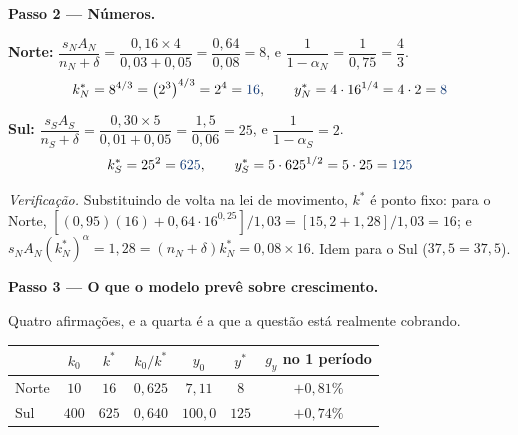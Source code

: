 \documentclass[11pt, a4paper]{article}
\newcommand{\passo}[1]{\medskip\noindent\textbf{#1}\par\nobreak}
\newcommand{\resp}[1]{%
  \ifmmode {\color{darkblue}#1}\else\textcolor{darkblue}{\textbf{#1}}\fi}
\newcommand{\stst}{^{\ast}}
\begin{document}
\passo{Passo 2 --- Números.}

\textbf{Norte:} $\dfrac{s_N A_N}{n_N+\delta} = \dfrac{0{,}16 \times 4}{0{,}03+0{,}05}
= \dfrac{0{,}64}{0{,}08} = 8$, e $\dfrac{1}{1-\alpha_N} = \dfrac{1}{0{,}75} = \dfrac43$.
$$k\stst_N = 8^{4/3} = \left(2^3\right)^{4/3} = 2^4 = \resp{16},
\qquad y\stst_N = 4 \cdot 16^{1/4} = 4 \cdot 2 = \resp{8}$$

\textbf{Sul:} $\dfrac{s_S A_S}{n_S+\delta} = \dfrac{0{,}30 \times 5}{0{,}01+0{,}05}
= \dfrac{1{,}5}{0{,}06} = 25$, e $\dfrac{1}{1-\alpha_S} = 2$.
$$k\stst_S = 25^2 = \resp{625},
\qquad y\stst_S = 5 \cdot 625^{1/2} = 5 \cdot 25 = \resp{125}$$

\emph{Verificação.} Substituindo de volta na lei de movimento, $k\stst$ é ponto fixo:
para o Norte, $[(0{,}95)(16) + 0{,}64 \cdot 16^{0{,}25}]/1{,}03 = [15{,}2+1{,}28]/1{,}03
= 16$; e $s_N A_N (k\stst_N)^{\alpha} = 1{,}28 = (n_N+\delta)k\stst_N = 0{,}08 \times 16$.
Idem para o Sul ($37{,}5 = 37{,}5$). \checkmark

\passo{Passo 3 --- O que o modelo prevê sobre crescimento.} Quatro afirmações, e a quarta é
a que a questão está realmente cobrando.

\begin{center}
\small
\begin{tabular}{lcccccc}
\toprule
 & $k_0$ & $k\stst$ & $k_0/k\stst$ & $y_0$ & $y\stst$ & $g_y$ no 1\textordmasculine{} período \\
\midrule
Norte & $10$  & $16$  & $0{,}625$ & $7{,}11$  & $8$   & $+0{,}81\%$ \\
Sul   & $400$ & $625$ & $0{,}640$ & $100{,}0$ & $125$ & $+0{,}74\%$ \\
\bottomrule
\end{tabular}
\end{center}
\end{document}
